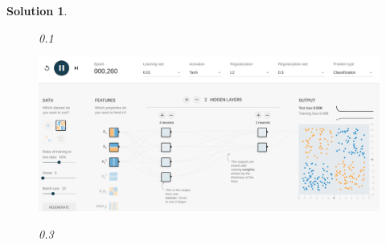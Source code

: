 \documentclass[a4paper,UTF8]{article}
\numberwithin{equation}{section}
\newtheorem*{solution}{Solution}
\begin{document}
\begin{solution}
\begin{enumerate}[(1)]
\begin{figure}[!htb]
			\label{Fig:2}
			\caption{0.1}
		\end{figure}
		\begin{figure}[!htb]
			\centering
			\includegraphics[width=1\textwidth]{pic/2.png}
			\label{Fig:3}
			\caption{0.3}
		\end{figure}
	\end{enumerate}
\end{solution}
\end{document}
